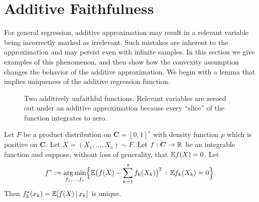 
\section{Additive Faithfulness}

For general regression, additive approximation may result in a
relevant variable being incorrectly marked as irrelevant. Such
mistakes are inherent to the approximation and may persist even with
infinite samples.  In this section we give
examples of this phenomenon, and then show how the convexity
assumption
changes the behavior of the additive approximation.  We begin
with a lemma that implies uniqueness of the additive regression function.


\begin{figure}[htp]
\vskip-10pt
	\centering
\caption{Two additively unfaithful functions. Relevant variables are
  zeroed out under an additive approximation because every ``slice''
  of the function integrates to zero.}
\vskip-10pt
\end{figure}


\begin{lemma}
\label{lem:general_int_reduction}
Let $F$ be a product distribution on $\mathbf{C}=[0,1]^s$ with density function $p$ which is positive on $\mathbf{C}$. Let
$X=(X_1,...,X_s) \sim F$. Let $f: \mbox{\boldmath $C$} \rightarrow \mathbb{R}$ be an
integrable function and suppose, without loss of generality, that ${\mathbb E} f(X) = 0$.
Let 
\begin{equation}
f^* := \mathop{\text{\rm arg\,min}}_{f_1,\ldots, f_s} \Bigl\{ {\mathbb E} \bigl( f(X) -
\sum_{k=1}^s f_k(X_k) \bigr)^2 \,:\, {\mathbb E} f_k(X_k) = 0\Bigr\}.
\end{equation}
Then $f^*_k(x_k) = {\mathbb E}[ f(X) {\,|\,} x_k]$ is unique.
\end{lemma}

